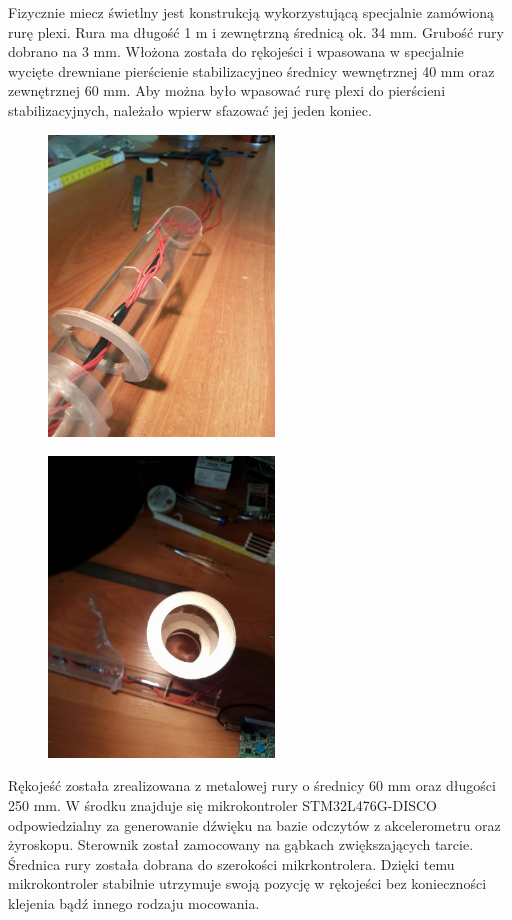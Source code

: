 \documentclass[10pt, a4paper]{article}
\begin{document}
Fizycznie miecz świetlny jest konstrukcją wykorzystującą specjalnie zamówioną rurę plexi. Rura ma długość 1 m  i zewnętrzną średnicą ok. 34 mm. Grubość rury dobrano na 3 mm. Włożona została do rękojeści i wpasowana w specjalnie wycięte drewniane pierścienie stabilizacyjneo średnicy wewnętrznej 40 mm oraz zewnętrznej 60 mm. Aby można było wpasować rurę plexi do pierścieni stabilizacyjnych, należało wpierw sfazować jej jeden koniec.\\	
\begin{figure}[H]
	\centering
	\includegraphics[width=60mm]{11.jpg}
	\end{figure}
	\begin{figure}[H]
	\centering
	\includegraphics[width=60mm]{12.jpg}
	\end{figure}
Rękojeść została zrealizowana z metalowej rury o średnicy 60 mm oraz długości 250 mm. W środku znajduje się mikrokontroler STM32L476G-DISCO odpowiedzialny za generowanie dźwięku na bazie odczytów z akcelerometru oraz żyroskopu. Sterownik został zamocowany na gąbkach zwiększających tarcie. Średnica rury została dobrana do szerokości mikrkontrolera. Dzięki temu mikrokontroler stabilnie utrzymuje swoją pozycję w rękojeści bez konieczności klejenia bądź innego rodzaju mocowania. 
\end{document}

